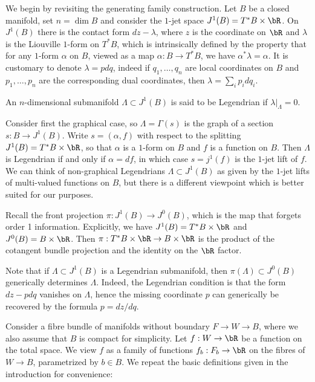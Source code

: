 We begin by revisiting the generating family construction. Let $B$ be a closed manifold, set $n=\dim B$ and consider the $1$-jet space $J^1(B)=T^*B \times \bR$. On $J^1(B)$ there is the contact form $dz-\lambda$, where $z$ is the coordinate on $\bR$ and $\lambda$ is the Liouville $1$-form on $T^*B$, which is intrinsically defined by the property that for any $1$-form $\alpha$ on $B$, viewed as a map $\alpha: B \to T^*B$, we have $\alpha^*\lambda=\alpha$. It is customary to denote $\lambda=pdq$, indeed if $q_1,\ldots, q_n$ are local coordinates on $B$ and $p_1,\ldots,p_n$ are the corresponding dual coordinates, then $\lambda=\sum_i p_i dq_i$.

\begin{definition} An $n$-dimensional submanifold $\Lambda \subset J^1(B)$ is said to be Legendrian if $\lambda |_\Lambda=0$.
\end{definition}

Consider first the graphical case, so $\Lambda=\Gamma(s)$ is the graph of a section $s:B \to J^1(B)$. Write $s=(\alpha,f)$ with respect to the splitting $J^1(B)=T^*B \times \bR$, so that $\alpha$ is a $1$-form on $B$ and $f$ is a function on $B$. Then $\Lambda$ is Legendrian if and only if $\alpha=df$, in which case $s=j^1(f)$ is the $1$-jet lift of $f$. We can think of non-graphical Legendrians $\Lambda \subset J^1(B)$ as given by the $1$-jet lifts of multi-valued functions on $B$, but there is a different viewpoint which is better suited for our purposes.

Recall the front projection $\pi:J^1(B) \to J^0(B)$, which is the map that forgets order 1 information. Explicitly, we have $J^1(B)=T^*B \times \bR$ and $J^0(B)=B \times \bR$. Then $\pi : T^*B \times \bR \to B \times \bR$ is the product of the cotangent bundle projection and the identity on the $\bR$ factor.

\begin{remark} Note that if $\Lambda \subset J^1(B)$ is a Legendrian submanifold, then $\pi(\Lambda) \subset J^0(B)$ generically determines $\Lambda$. Indeed, the Legendrian condition is that the form $dz-pdq$ vanishes on $\Lambda$, hence the missing coordinate $p$ can generically be recovered by the formula $p=dz/dq$.
\end{remark}

Consider a fibre bundle of manifolds without boundary $F \to W \to B$, where we also assume that $B$ is compact for simplicity. Let $f:W \to \bR$ be a function on the total space. We view $f$ as a family of functions $f_b:F_b \to \bR$ on the fibres of $W \to B$, parametrized by $b \in B$. We repeat the basic definitions given in the introduction for convenience:

